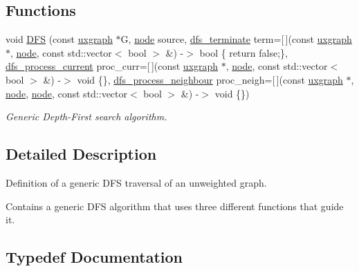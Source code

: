 \subsection*{Functions}
\begin{DoxyCompactItemize}
\item 
void \hyperlink{namespacelgraph_1_1traversal_1_1dfs_a42533f44875cda914e453cb6dd673600}{D\+FS} (const \hyperlink{classlgraph_1_1uxgraph}{uxgraph} $\ast$G, \hyperlink{namespacelgraph_a397169dd66adf725210a30fb7251773e}{node} source, \hyperlink{namespacelgraph_1_1traversal_1_1dfs_a1c5d35982c40d91ec2f9f06d341b30f0}{dfs\+\_\+terminate} term=\mbox{[}$\,$\mbox{]}(const \hyperlink{classlgraph_1_1uxgraph}{uxgraph} $\ast$, \hyperlink{namespacelgraph_a397169dd66adf725210a30fb7251773e}{node}, const std\+::vector$<$ bool $>$ \&) -\/$>$ bool \{ return false;\}, \hyperlink{namespacelgraph_1_1traversal_1_1dfs_a6e812ea9069ebb1e7e72776874825f0f}{dfs\+\_\+process\+\_\+current} proc\+\_\+curr=\mbox{[}$\,$\mbox{]}(const \hyperlink{classlgraph_1_1uxgraph}{uxgraph} $\ast$, \hyperlink{namespacelgraph_a397169dd66adf725210a30fb7251773e}{node}, const std\+::vector$<$ bool $>$ \&) -\/$>$ void \{\}, \hyperlink{namespacelgraph_1_1traversal_1_1dfs_ab56faeb9b70dd2449b91f404baf6a829}{dfs\+\_\+process\+\_\+neighbour} proc\+\_\+neigh=\mbox{[}$\,$\mbox{]}(const \hyperlink{classlgraph_1_1uxgraph}{uxgraph} $\ast$, \hyperlink{namespacelgraph_a397169dd66adf725210a30fb7251773e}{node}, \hyperlink{namespacelgraph_a397169dd66adf725210a30fb7251773e}{node}, const std\+::vector$<$ bool $>$ \&) -\/$>$ void \{\})
\begin{DoxyCompactList}\small\item\em Generic Depth-\/\+First search algorithm. \end{DoxyCompactList}\end{DoxyCompactItemize}


\subsection{Detailed Description}
Definition of a generic D\+FS traversal of an unweighted graph. 

Contains a generic D\+FS algorithm that uses three different functions that guide it. 

\subsection{Typedef Documentation}
\mbox{\label{namespacelgraph_1_1traversal_1_1dfs_a6e812ea9069ebb1e7e72776874825f0f}} 
